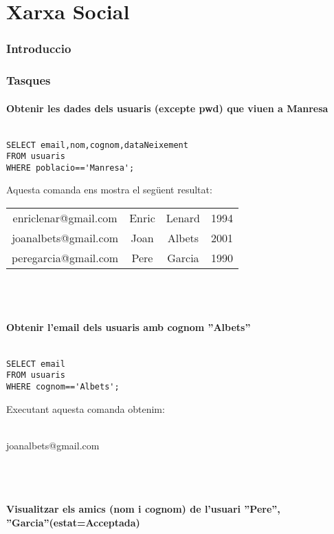 \documentclass[11p]{article}
\begin{document}
\part{Xarxa Social}
\section{Introduccio}

\section{Tasques}
\subsection{Obtenir les dades dels usuaris (excepte pwd) que viuen a Manresa}

\begin{lstlisting}

SELECT email,nom,cognom,dataNeixement 
FROM usuaris 
WHERE poblacio=='Manresa';

\end{lstlisting}
Aquesta comanda ens mostra el següent resultat:\\

\begin{tabular}{c c c c}
	enriclenar@gmail.com & Enric & Lenard & 1994 \\
    joanalbets@gmail.com & Joan & Albets & 2001\\
	peregarcia@gmail.com & Pere & Garcia & 1990 \\

\end{tabular}\\\\
\subsection{Obtenir l’email dels usuaris amb cognom ”Albets”}

\begin{lstlisting}

SELECT email 
FROM usuaris 
WHERE cognom=='Albets';

\end{lstlisting}
Executant aquesta comanda obtenim:\\\\
\centerline{joanalbets@gmail.com} \\\\


\subsection{Visualitzar els amics (nom i cognom) de l’usuari ”Pere”, ”Garcia”(estat=Acceptada)}
\end{document}
